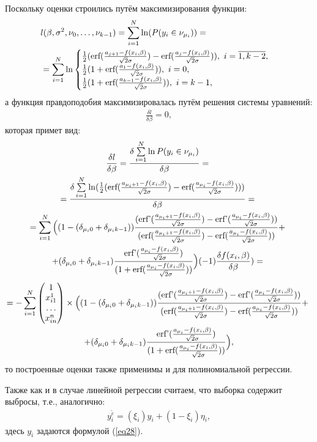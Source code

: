 Поскольку оценки строились путём максимизирования функции:
\begin{eqnarray}
    &l(\beta,\sigma^2, \nu_0,\dots, \nu_{k-1})=\sum_{i=1}^{N}\ln(P(y_i\in \nu_{\mu_i}))=\\
    &=\sum\limits_{i=1}^{N}\ln\begin{cases}
        \frac{1}{2}(\textup{erf}(\frac{a_{j+1}-f(x_i,\beta)}{\sqrt{2}\sigma})-\textup{erf}(\frac{a_{j}-f(x_i,\beta)}{\sqrt{2}\sigma})),~i=\overline{1,k-2},\\
        \frac{1}{2}(1+\textup{erf}(\frac{a_{1}-f(x_i,\beta)}{\sqrt{2}\sigma})),~i=0,\\
        \frac{1}{2}(1+\textup{erf}(\frac{a_{k-1}-f(x_i,\beta)}{\sqrt{2}\sigma})),~i=k-1,
    \end{cases}
\end{eqnarray}
а функция правдоподобия максимизировалась путём решения системы уравнений:
\begin{eqnarray}
    \frac{\delta l}{\delta \beta}=0,
\end{eqnarray}
которая примет вид:
\begin{multline}
    \frac{\delta l}{\delta \beta}=\frac{\delta \sum\limits_{i=1}^{N}\ln P(y_i\in \nu_{\mu_i})}{\delta \beta}=~\\
    =\frac{\delta \sum\limits_{i=1}^{N} \ln(\frac{1}{2}(\textup{erf}(\frac{a_{\mu_i+1}-f(x_i,\beta)}{\sqrt{2}\sigma})-\textup{erf}(\frac{a_{\mu_i}-f(x_i,\beta)}{\sqrt{2}\sigma})) )         }{\delta \beta}=~\\
    =  \sum\limits_{i=1}^{N}\Big((1-(\delta_{\mu_i 0}+\delta_{\mu_i k-1}))\frac{(\textup{erf'}(\frac{a_{\mu_i+1}-f(x_i,\beta)}{\sqrt{2}\sigma})-\textup{erf'}(\frac{a_{\mu_i}-f(x_i,\beta)}{\sqrt{2}\sigma}))}{ (\textup{erf}(\frac{a_{\mu_i+1}-f(x_i,\beta)}{\sqrt{2}\sigma})-\textup{erf}(\frac{a_{\mu_i}-f(x_i,\beta)}{\sqrt{2}\sigma}))}+~\\
    +(\delta_{\mu_i 0}+\delta_{\mu_i k-1})\frac{\textup{erf'}(\frac{a_{\mu_i}-f(x_i,\beta)}{\sqrt{2}\sigma})}{(1+\textup{erf}(\frac{a_{\mu_i}-f(x_i,\beta)}{\sqrt{2}\sigma}))}\Big)  (-1) \frac{\delta f(x_i,\beta)}{\delta \beta} )=~
\end{multline}
\begin{multline}
    \nonumber 
    =-\sum_{i=1}^{N}\begin{pmatrix}
        1\\
        x_{i1}^1\\
        \dots\\
        x_{in}^n
    \end{pmatrix}\times  \Big((1-(\delta_{\mu_i 0}+\delta_{\mu_i k-1}))\frac{(\textup{erf'}(\frac{a_{\mu_i+1}-f(x_i,\beta)}{\sqrt{2}\sigma})-\textup{erf'}(\frac{a_{\mu_i}-f(x_i,\beta)}{\sqrt{2}\sigma}))}{ (\textup{erf}(\frac{a_{\mu_i+1}-f(x_i,\beta)}{\sqrt{2}\sigma})-\textup{erf}(\frac{a_{\mu_i}-f(x_i,\beta)}{\sqrt{2}\sigma}))}+~\\
    +(\delta_{\mu_i 0}+\delta_{\mu_i k-1})\frac{\textup{erf'}(\frac{a_{\mu_i}-f(x_i,\beta)}{\sqrt{2}\sigma})}{(1+\textup{erf}(\frac{a_{\mu_i}-f(x_i,\beta)}{\sqrt{2}\sigma}))}\Big),
\end{multline}
то построенные оценки также применимы и для полиномиальной регрессии.

Также как и в случае линейной регрессии считаем, что выборка содержит выбросы, т.е., аналогично:
\begin{eqnarray}
    y_i^{\widetilde{\varepsilon}}=(\xi_i)y_i+ (1-\xi_i)\eta_i,
\end{eqnarray}
здесь $y_i$ задаются формулой (\ref{eq28}).

